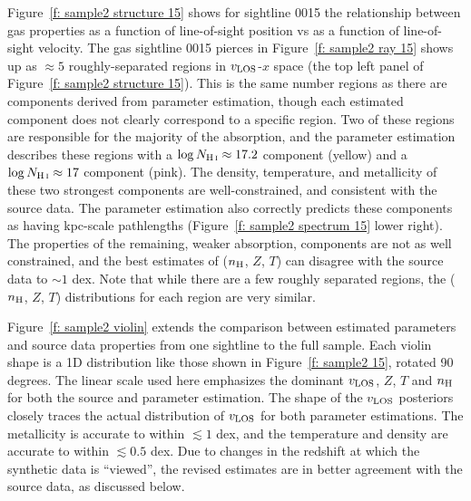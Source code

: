\documentclass[fleqn,usenatbib]{mnras}
\begin{document}
Figure~\ref{f: sample2 structure 15} shows for sightline 0015 the relationship between gas properties as a function of line-of-sight position vs as a function of line-of-sight velocity.
The gas sightline 0015 pierces in Figure~\ref{f: sample2 ray 15} shows up as $\approx 5$ roughly-separated regions in $v_{\rm LOS}$-$x$ space (the top left panel of Figure~\ref{f: sample2 structure 15}).
This is the same number regions as there are components derived from parameter estimation,
though each estimated component does not clearly correspond to a specific region.
Two of these regions are responsible for the majority of the  absorption,
and the parameter estimation describes these regions with a $\log N_{\ion{H}{I}} \approx 17.2$ component (yellow) and a $\log N_{\ion{H}{I}} \approx 17$ component (pink).
The density, temperature, and metallicity of these two strongest components are well-constrained, and consistent with the source data.
The parameter estimation also correctly predicts these components as having kpc-scale pathlengths (Figure~\ref{f: sample2 spectrum 15} lower right).
The properties of the remaining, weaker absorption, components are not as well constrained, and the best estimates of ($n_{\rm H}$, $Z$, $T$) can disagree with the source data to $\sim 1$ dex.
Note that while there are a few roughly separated regions, the ($n_{\rm H}$, $Z$, $T$) distributions for each region are very similar.

Figure~\ref{f: sample2 violin} extends the comparison between estimated parameters and source data properties from one sightline to the full sample.
Each violin shape is a 1D distribution like those shown in Figure~\ref{f: sample2 15}, rotated 90 degrees.
The linear scale used here emphasizes the dominant $v_{\rm LOS}$, $Z$, $T$ and $n_{\rm H}$ for both the source and parameter estimation.
The shape of the $v_{\rm LOS}$ posteriors closely traces the actual distribution of $v_{\rm LOS}$ for both parameter estimations.
The metallicity is accurate to within $\lesssim 1$ dex,
and the temperature and density are accurate to within $\lesssim 0.5$ dex.
Due to changes in the redshift at which the synthetic data is ``viewed'', the revised estimates are in better agreement with the source data,
as discussed below.
\end{document}

